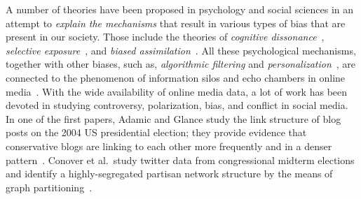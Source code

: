 \documentclass[a4paper,11pt]{article}
\begin{document}
%
%
A number of theories have been proposed in psychology and social sciences 
in an attempt to {\em explain the mech\-a\-nisms} that result in various types
of bias that are present in our society. 
Those include the theories of 
{\em cognitive dissonance}~\cite{festinger1962theory}, 
\emph{selective exposure}~\cite{frey1986recent}, and
\emph{biased assimilation}~\cite{lord1979biased}. 
All these psychological mech\-a\-nisms, 
together with other biases, such as, 
\emph{algorithmic filtering} and \emph{personalization}~\cite{bozdag2013bias}, 
are connected to the phenomenon of information silos and echo chambers
in online media~\cite{pariser2011filter}.
% 
With the wide availability of online media data, 
a lot of work has been devoted in studying 
controversy, polarization, bias, and conflict in social media. 
In one of the first papers, Adamic and Glance
study the link structure of blog posts on the 2004 US presidential election;
they provide evidence that conservative blogs are linking 
to each other more frequently and in a denser pattern~\cite{adamic2005political}. 
Conover et al.\ study twitter data from congressional midterm elections
and identify a highly-segregated partisan network structure
by the means of graph partitioning~\cite{conover2011political}. 
\end{document}
